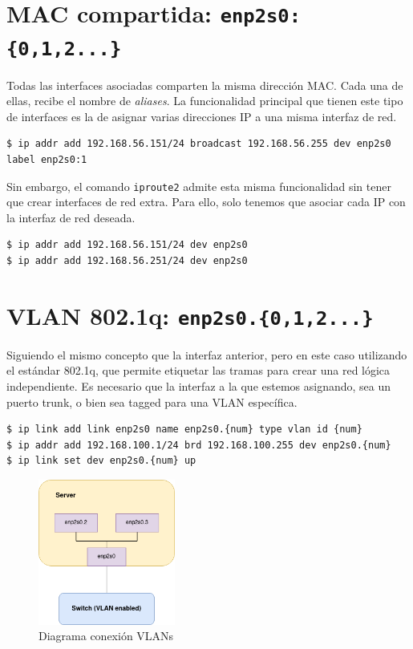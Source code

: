 \documentclass[a4paper, oneside, 12pt]{book}
\begin{document}
	\pagebreak
	
	\section{MAC compartida: \texttt{enp2s0:\{0,1,2...\}}}
	\par \noindent Todas las interfaces asociadas comparten la misma dirección MAC. Cada una de ellas, recibe el nombre de \textit{aliases}. La funcionalidad principal que tienen este tipo de interfaces es la de asignar varias direcciones IP a una misma interfaz de red.
	
	\begin{verbatim}
$ ip addr add 192.168.56.151/24 broadcast 192.168.56.255 dev enp2s0 
label enp2s0:1
	\end{verbatim}

	\par \noindent Sin embargo, el comando \texttt{iproute2} admite esta misma funcionalidad sin tener que crear interfaces de red extra. Para ello, solo tenemos que asociar cada IP con la interfaz de red deseada.
	\begin{verbatim}
$ ip addr add 192.168.56.151/24 dev enp2s0
$ ip addr add 192.168.56.251/24 dev enp2s0
	\end{verbatim}

	\section{VLAN 802.1q: \texttt{enp2s0.\{0,1,2...\}}}
	\par \noindent Siguiendo el mismo concepto que la interfaz anterior, pero en este caso utilizando el estándar 802.1q, que permite etiquetar las tramas para crear una red lógica independiente. Es necesario que la interfaz a la que estemos asignando, sea un puerto trunk, o bien sea tagged para una VLAN específica.
	
	\begin{verbatim}
$ ip link add link enp2s0 name enp2s0.{num} type vlan id {num}
$ ip addr add 192.168.100.1/24 brd 192.168.100.255 dev enp2s0.{num}
$ ip link set dev enp2s0.{num} up
	\end{verbatim}

	\begin{figure}[h!]
		\begin{center}
			\includegraphics[width=0.4\textwidth]{img/diag_vlan.png}
			\caption{Diagrama conexión VLANs}
		\end{center}
	\end{figure}
\end{document}
